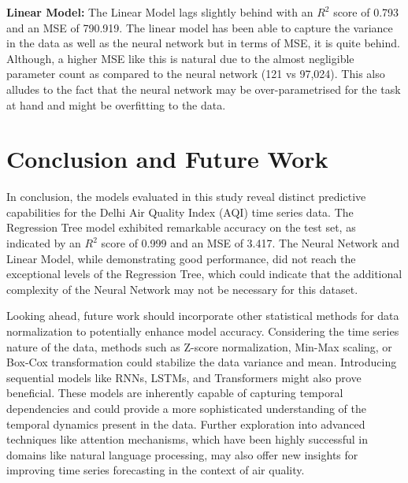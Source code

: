 \documentclass[12pt,a4paper]{article}
\begin{document}
\textbf{Linear Model:}
The Linear Model lags slightly behind with an \( R^2 \) score of 0.793 and an MSE of 790.919. The linear model has been able to capture the variance in the data as well as the neural network but in terms of MSE, it is quite behind. Although, a higher MSE like this is natural due to the almost negligible parameter count as compared to the neural network (121 vs 97,024). This also alludes to the fact that the neural network may be over-parametrised for the task at hand and might be overfitting to the data.

\section{Conclusion and Future Work}

In conclusion, the models evaluated in this study reveal distinct predictive capabilities for the Delhi Air Quality Index (AQI) time series data. The Regression Tree model exhibited remarkable accuracy on the test set, as indicated by an \( R^2 \) score of 0.999 and an MSE of 3.417. The Neural Network and Linear Model, while demonstrating good performance, did not reach the exceptional levels of the Regression Tree, which could indicate that the additional complexity of the Neural Network may not be necessary for this dataset.

Looking ahead, future work should incorporate other statistical methods for data normalization to potentially enhance model accuracy. Considering the time series nature of the data, methods such as Z-score normalization, Min-Max scaling, or Box-Cox transformation could stabilize the data variance and mean. Introducing sequential models like RNNs, LSTMs, and Transformers might also prove beneficial. These models are inherently capable of capturing temporal dependencies and could provide a more sophisticated understanding of the temporal dynamics present in the data. Further exploration into advanced techniques like attention mechanisms, which have been highly successful in domains like natural language processing, may also offer new insights for improving time series forecasting in the context of air quality.
\end{document}
